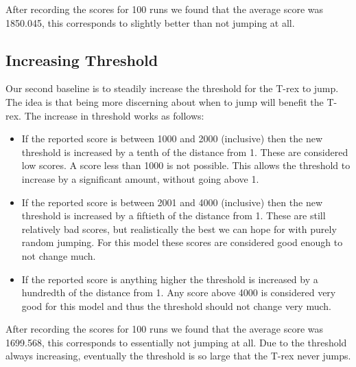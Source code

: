 \documentclass{scrartcl}
\begin{document}
After recording the scores for 100 runs we found that the average score was
1850.045, this corresponds to slightly better than not jumping at all.

\subsection{Increasing Threshold}
Our second baseline is to steadily increase the threshold for the T-rex to jump.
The idea is that being more discerning about when to jump will benefit the
T-rex. The increase in threshold works as follows:
\begin{itemize}
  \item If the reported score is between 1000 and 2000 (inclusive) then the new
    threshold is increased by a tenth of the distance from 1. These are
    considered low scores. A score less than 1000 is not possible. This allows
    the threshold to increase by a significant amount, without going above 1.
  \item If the reported score is between 2001 and 4000 (inclusive) then the new
    threshold is increased by a fiftieth of the distance from 1. These are still
    relatively bad scores, but realistically the best we can hope for with
    purely random jumping. For this model these scores are considered good
    enough to not change much.
  \item If the reported score is anything higher the threshold is increased by a
    hundredth of the distance from 1. Any score above 4000 is considered very
    good for this model and thus the threshold should not change very much.
\end{itemize}

After recording the scores for 100 runs we found that the average score was
1699.568, this corresponds to essentially not jumping at all. Due to the
threshold always increasing, eventually the threshold is so large that the T-rex
never jumps.
\end{document}

